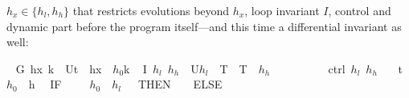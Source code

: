 \documentclass[envcountsame,envcountsect]{llncs}
\begin{document}
\begin{example}
$h_x\in\{h_l,h_h\}$ that restricts evolutions beyond $h_x$,
loop invariant $I$, control and dynamic part before the program
itself---and this time a differential invariant  as well:
\begin{isabellebody}
\isanewline
{}\ %
{\isachardoublequoteopen}G\ h\isactrlsub x\ k\ {\isasymequiv}\ U{\isacharparenleft}t\ {\isasymle}\ {\isacharparenleft}h\isactrlsub x\ {\isacharminus}\ $h_0${\isacharparenright}{\isacharslash}k{\isacharparenright}{\isachardoublequoteclose}\isanewline
\isanewline
{}\ %
{\isachardoublequoteopen}I\ $h_l$\ $h_h$\ {\isasymequiv}\ U{\isacharparenleft}$h_l$\ {\isasymle}\ T\ {\isasymand}\ T\ {\isasymle}\ $h_h$\ {\isasymand}\ {\isacharparenleft}{\isasympi}\ {\isacharequal}\ {}\ {\isasymor}\ {\isasympi}\ {\isacharequal}\ {}{\isacharparenright}{\isacharparenright}{\isachardoublequoteclose}\isanewline
\isanewline
{}\ %
{\isachardoublequoteopen}ctrl\ $h_l$\ $h_h$\ {\isasymequiv}\isanewline
\ \ {\isacharparenleft}t\ {\isacharcolon}{\isacharcolon}{\isacharequal}{}{\isacharparenright}{\isacharsemicolon}{\isacharparenleft}$h_0$\ {\isacharcolon}{\isacharcolon}{\isacharequal}\ h{\isacharparenright}{\isacharsemicolon}\isanewline
\ \ {\isacharparenleft}IF\ {\isacharparenleft}{\isasympi}\ {\isacharequal}\ {}\ {\isasymand}\ $h_0$\ {\isasymle}\ $h_l$\ {\isacharplus}\ {}{\isacharparenright}\ THEN\ {\isacharparenleft}{\isasympi}\ {\isacharcolon}{\isacharcolon}{\isacharequal}\ {}{\isacharparenright}\ ELSE\isanewline

\end{isabellebody}
\end{example}
\end{document}
